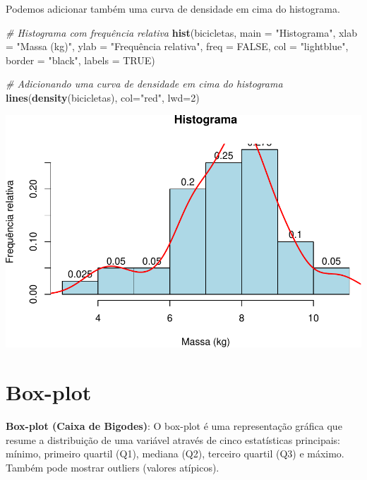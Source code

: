 \documentclass[
]{book}
\newenvironment{Shaded}{\begin{snugshade}}{\end{snugshade}}
\newcommand{\AttributeTok}[1]{\textcolor[rgb]{0.13,0.29,0.53}{#1}}
\newcommand{\CommentTok}[1]{\textcolor[rgb]{0.56,0.35,0.01}{\textit{#1}}}
\newcommand{\ConstantTok}[1]{\textcolor[rgb]{0.56,0.35,0.01}{#1}}
\newcommand{\DecValTok}[1]{\textcolor[rgb]{0.00,0.00,0.81}{#1}}
\newcommand{\FunctionTok}[1]{\textcolor[rgb]{0.13,0.29,0.53}{\textbf{#1}}}
\newcommand{\NormalTok}[1]{#1}
\newcommand{\StringTok}[1]{\textcolor[rgb]{0.31,0.60,0.02}{#1}}
\begin{document}
Podemos adicionar também uma curva de densidade em cima do histograma.

\begin{Shaded}
\begin{Highlighting}[]
\CommentTok{\# Histograma com frequência relativa}
\FunctionTok{hist}\NormalTok{(bicicletas,}
  \AttributeTok{main =} \StringTok{"Histograma"}\NormalTok{,          }
  \AttributeTok{xlab =} \StringTok{"Massa (kg)"}\NormalTok{,          }
  \AttributeTok{ylab =} \StringTok{"Frequência relativa"}\NormalTok{,     }
  \AttributeTok{freq =} \ConstantTok{FALSE}\NormalTok{,}
  \AttributeTok{col =} \StringTok{"lightblue"}\NormalTok{,}
  \AttributeTok{border =} \StringTok{"black"}\NormalTok{,}
  \AttributeTok{labels =} \ConstantTok{TRUE}\NormalTok{)}

\CommentTok{\# Adicionando uma curva de densidade em cima do histograma}
\FunctionTok{lines}\NormalTok{(}\FunctionTok{density}\NormalTok{(bicicletas), }\AttributeTok{col=}\StringTok{"red"}\NormalTok{, }\AttributeTok{lwd=}\DecValTok{2}\NormalTok{)}
\end{Highlighting}
\end{Shaded}

\includegraphics{introR_files/figure-latex/unnamed-chunk-172-1.pdf}

\section{Box-plot}\label{box-plot}

\textbf{Box-plot (Caixa de Bigodes)}: O box-plot é uma representação gráfica
que resume a distribuição de uma variável através de cinco estatísticas
principais: mínimo, primeiro quartil (Q1), mediana (Q2), terceiro
quartil (Q3) e máximo. Também pode mostrar outliers (valores atípicos).
\end{document}
